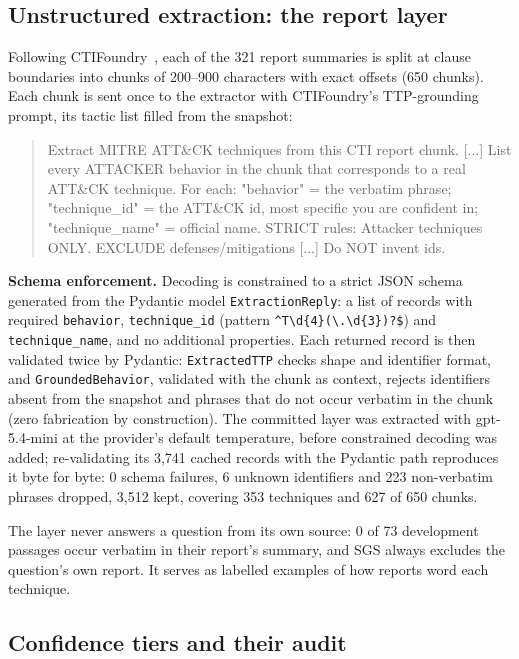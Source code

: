\documentclass[conference]{IEEEtran}
\begin{document}
\subsection{Unstructured extraction: the report layer}

Following CTIFoundry~\cite{ctifoundry}, each of the 321 report summaries is split at clause boundaries into chunks of 200--900 characters with exact offsets (650 chunks). Each chunk is sent once to the extractor with CTIFoundry's TTP-grounding prompt, its tactic list filled from the snapshot:

\begin{quote}\footnotesize\ttfamily
Extract MITRE ATT\&CK techniques from this CTI report chunk. [...] List every ATTACKER behavior in the chunk that corresponds to a real ATT\&CK technique. For each: "behavior" = the verbatim phrase; "technique\_id" = the ATT\&CK id, most specific you are confident in; "technique\_name" = official name. STRICT rules: Attacker techniques ONLY. EXCLUDE defenses/mitigations [...] Do NOT invent ids.
\end{quote}

\textbf{Schema enforcement.} Decoding is constrained to a strict JSON schema generated from the Pydantic model \texttt{ExtractionReply}: a list of records with required \texttt{behavior}, \texttt{technique\_id} (pattern \verb|^T\d{4}(\.\d{3})?$|) and \texttt{technique\_name}, and no additional properties. Each returned record is then validated twice by Pydantic: \texttt{ExtractedTTP} checks shape and identifier format, and \texttt{GroundedBehavior}, validated with the chunk as context, rejects identifiers absent from the snapshot and phrases that do not occur verbatim in the chunk (zero fabrication by construction). The committed layer was extracted with gpt-5.4-mini at the provider's default temperature, before constrained decoding was added; re-validating its 3,741 cached records with the Pydantic path reproduces it byte for byte: 0 schema failures, 6 unknown identifiers and 223 non-verbatim phrases dropped, 3,512 kept, covering 353 techniques and 627 of 650 chunks.

The layer never answers a question from its own source: 0 of 73 development passages occur verbatim in their report's summary, and SGS always excludes the question's own report. It serves as labelled examples of how reports word each technique.

\subsection{Confidence tiers and their audit}\label{sec:conf}
\end{document}
